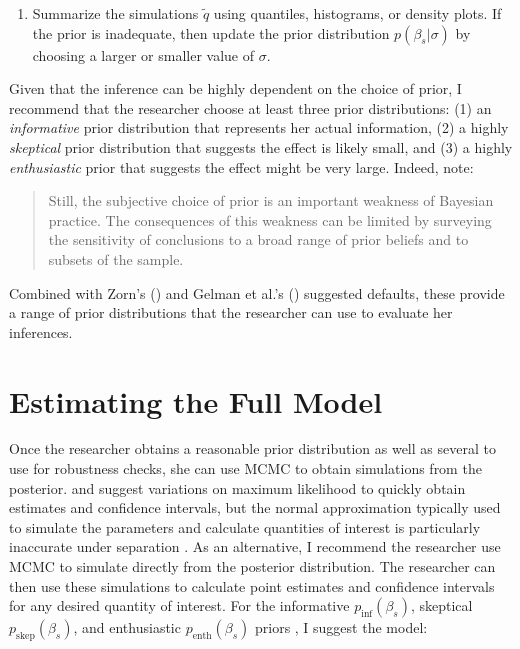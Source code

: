 \documentclass[12pt]{article}
\begin{document}
\begin{enumerate}
\item Summarize the simulations $\tilde{q}$ using quantiles, histograms, or density plots. 
If the prior is inadequate, then update the prior distribution $p(\beta_s | \sigma)$ by choosing a larger or smaller value of $\sigma$.
\end{enumerate}

Given that the inference can be highly dependent on the choice of prior, I recommend that the researcher choose at least three prior distributions: (1) an \emph{informative} prior distribution that represents her actual information, (2) a highly \emph{skeptical} prior distribution that suggests the effect is likely small, and (3) a highly \emph{enthusiastic} prior that suggests the effect might be very large. 
Indeed, \citet[p. 422]{WesternJackman1994} note: 
\begin{quote}
Still, the subjective choice of prior is an important weakness of Bayesian practice. The consequences of this weakness can be limited by surveying the sensitivity of conclusions to a broad range of prior beliefs and to subsets of the sample.
\end{quote}
Combined with Zorn's (\citeyear{Zorn2005}) and Gelman et al.'s (\citeyear{Gelmanetal2008}) suggested defaults, these provide a range of prior distributions that the researcher can use to evaluate her inferences.

\section*{Estimating the Full Model}

Once the researcher obtains a reasonable prior distribution as well as several to use for robustness checks, she can use MCMC \citep{Jackman2000} to obtain simulations from the posterior. 
\cite{Zorn2005} and \cite{Gelmanetal2008} suggest variations on maximum likelihood to quickly obtain estimates and confidence intervals, but the normal approximation typically used to simulate the parameters and calculate quantities of interest \citep{KingTomzWittenberg2000} is particularly inaccurate under separation \citep{HeinzeSchemper2002}. 
As an alternative, I recommend the researcher use MCMC to simulate directly from the posterior distribution. 
The researcher can then use these simulations to calculate point estimates and confidence intervals for any desired quantity of interest. 
For the informative $p_{\text{inf}}(\beta_s)$, skeptical $p_{\text{skep}}(\beta_s)$, and enthusiastic $p_{\text{enth}}(\beta_s)$ priors , I suggest the model:
\end{document}
